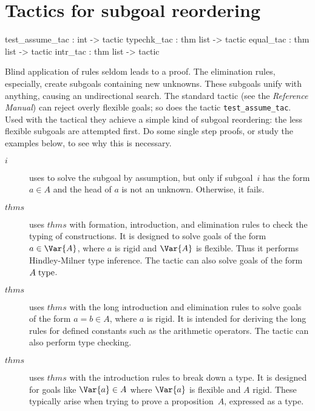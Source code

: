 \section{Tactics for subgoal reordering}
\begin{ttbox}
test_assume_tac : int -> tactic
typechk_tac     : thm list -> tactic
equal_tac       : thm list -> tactic
intr_tac        : thm list -> tactic
\end{ttbox}
Blind application of {\CTT} rules seldom leads to a proof.  The elimination
rules, especially, create subgoals containing new unknowns.  These subgoals
unify with anything, causing an undirectional search.  The standard tactic
 (see the {\em Reference Manual}) can reject
overly flexible goals; so does the {\CTT} tactic {\tt test_assume_tac}.
Used with the tactical  they achieve a simple kind of
subgoal reordering: the less flexible subgoals are attempted first.  Do
some single step proofs, or study the examples below, to see why this is
necessary.
\begin{description}
\item[ $i$] 
uses  to solve the subgoal by assumption, but only if
subgoal~$i$ has the form $a\in A$ and the head of $a$ is not an unknown.
Otherwise, it fails.

\item[ $thms$] 
uses $thms$ with formation, introduction, and elimination rules to check
the typing of constructions.  It is designed to solve goals of the form
$a\in \Var{A}$, where $a$ is rigid and $\Var{A}$ is flexible.  Thus it
performs Hindley-Milner type inference.  The tactic can also solve goals of
the form $A\;\rm type$.

\item[ $thms$]
uses $thms$ with the long introduction and elimination rules to solve goals
of the form $a=b\in A$, where $a$ is rigid.  It is intended for deriving
the long rules for defined constants such as the arithmetic operators.  The
tactic can also perform type checking.

\item[ $thms$]
uses $thms$ with the introduction rules to break down a type.  It is
designed for goals like $\Var{a}\in A$ where $\Var{a}$ is flexible and $A$
rigid.  These typically arise when trying to prove a proposition~$A$,
expressed as a type.
\end{description}



